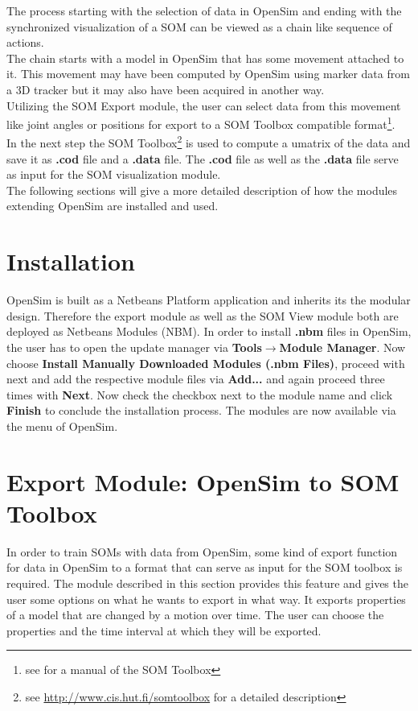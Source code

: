 \documentclass[a4paper]{scrartcl}
\begin{document}
The process starting with the selection of data in OpenSim and ending with the synchronized visualization of a SOM can be viewed as a chain like sequence of actions.\\
The chain starts with a model in OpenSim that has some movement attached to it. This movement may have been computed by OpenSim using marker data from a 3D tracker but it may also have been acquired in another way.\\
Utilizing the SOM Export module, the user can select data from this movement like joint angles or positions for export to a SOM Toolbox compatible format\footnote{see \cite{toolbox-manual} for a manual of the SOM Toolbox}.\\
In the next step the SOM Toolbox\footnote{see \href{http://www.cis.hut.fi/somtoolbox}{http://www.cis.hut.fi/somtoolbox} for a detailed description} is used to compute a umatrix of the data and save it as \textbf{.cod} file and a \textbf{.data} file.
The \textbf{.cod} file as well as the \textbf{.data} file serve as input for the SOM visualization module.\\
The following sections will give a more detailed description of how the modules extending OpenSim are installed and used.


\section{Installation}
OpenSim is built as a Netbeans Platform application and inherits its the modular design.
Therefore the export module as well as the SOM View module both are deployed as Netbeans Modules (NBM).
In order to install \textbf{.nbm} files in OpenSim, the user has to open the update manager via \textbf{Tools}$\rightarrow$\textbf{Module Manager}.
Now choose \textbf{Install Manually Downloaded Modules (.nbm Files)}, proceed with next and add the respective module files via \textbf{Add...} and again proceed three times with \textbf{Next}.
Now check the checkbox next to the module name and click \textbf{Finish} to conclude the installation process.
The modules are now available via the menu of OpenSim.


\section{Export Module: OpenSim to SOM Toolbox}
In order to train SOMs with data from OpenSim, some kind of export function for data in OpenSim to a format that can serve as input for the SOM toolbox is required. The module described in this section provides this feature and gives the user some options on what he wants to export in what way.
It exports properties of a model that are changed by a motion over time. The user can choose the properties and the time interval at which they will be exported.
\end{document}
